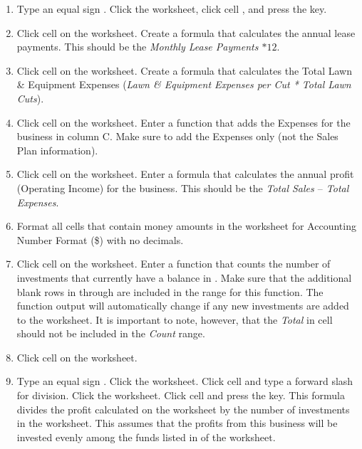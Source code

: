 \begin{enumerate}
	\item Type an equal sign \fmtTyping{=}. Click the  worksheet, click cell , and press the  key.
	
	\item Click cell  on the  worksheet. Create a formula that calculates the annual lease payments. This should be the \textit{Monthly Lease Payments $ * 12 $}.
	
	\item Click cell  on the  worksheet. Create a formula that calculates the Total Lawn \& Equipment Expenses (\textit{Lawn \& Equipment Expenses per Cut * Total Lawn Cuts}).
	
	\item Click cell  on the  worksheet. Enter a  function that adds the Expenses for the business in column C. Make sure to add the Expenses only (not the Sales Plan information).
	
	\item Click cell  on the  worksheet. Enter a formula that calculates the annual profit (Operating Income) for the business. This should be the \textit{Total Sales $ – $ Total Expenses}.
	
	\item Format all cells that contain money amounts in the  worksheet for Accounting Number Format (\$) with no decimals.
	
	\item Click cell  on the  worksheet. Enter a  function that counts the number of investments that currently have a balance in . Make sure that the additional blank rows in  through  are included in the range for this function. The function output will automatically change if any new investments are added to the worksheet. It is important to note, however, that the \textit{Total} in cell  should not be included in the \textit{Count} range.
	
	\item Click cell  on the  worksheet.
	
	\item Type an equal sign \fmtTyping{=}. Click the  worksheet. Click cell  and type a forward slash \fmtTyping{/} for division. Click the  worksheet. Click cell  and press the  key. This formula divides the profit calculated on the  worksheet by the number of investments in the  worksheet. This assumes that the profits from this business will be invested evenly among the funds listed in  of the  worksheet.
	

\end{enumerate}
